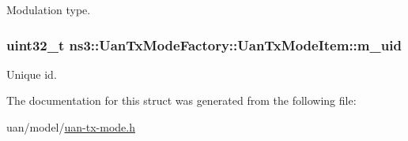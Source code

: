 Modulation type. 

\subsubsection[{\texorpdfstring{m\+\_\+uid}{m_uid}}]{\setlength{\rightskip}{0pt plus 5cm}uint32\+\_\+t ns3\+::\+Uan\+Tx\+Mode\+Factory\+::\+Uan\+Tx\+Mode\+Item\+::m\+\_\+uid}\hypertarget{structns3_1_1UanTxModeFactory_1_1UanTxModeItem_aa0d23f52c8c71f969151df2c7fe1dfed}{}\label{structns3_1_1UanTxModeFactory_1_1UanTxModeItem_aa0d23f52c8c71f969151df2c7fe1dfed}


Unique id. 



The documentation for this struct was generated from the following file\+:\begin{DoxyCompactItemize}
\item 
uan/model/\hyperlink{uan-tx-mode_8h}{uan-\/tx-\/mode.\+h}\end{DoxyCompactItemize}
